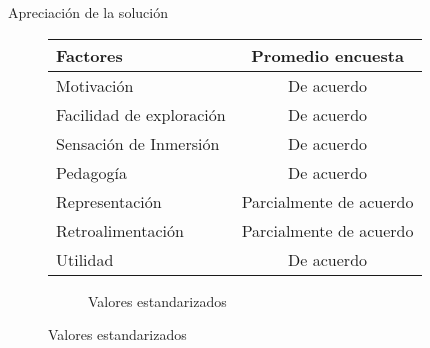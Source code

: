 \begin{frame}{Apreciación de la solución}

\begin{figure}
    \scriptsize
    \centering
    \begin{subtable}[b]{.5\linewidth}
        \tiny
        \begin{tabular}{lc}
        \toprule
        Factores                 & Promedio encuesta \\
        \midrule
        Motivación               & De acuerdo \\
        Facilidad de exploración & De acuerdo \\
        Sensación de Inmersión   & De acuerdo \\
        Pedagogía                & De acuerdo \\
        Representación           & Parcialmente de acuerdo \\
        Retroalimentación        & Parcialmente de acuerdo \\
        Utilidad                 & De acuerdo \\
        \bottomrule
        \end{tabular}
        \caption{Aceptación por aspecto de la solución}
    \end{subtable}\hfill
    \pause
    \begin{subfigure}[b]{.5\linewidth}
        \tiny
        \caption{Valores estandarizados}
    \end{subfigure}
\end{figure}

\end{frame}
